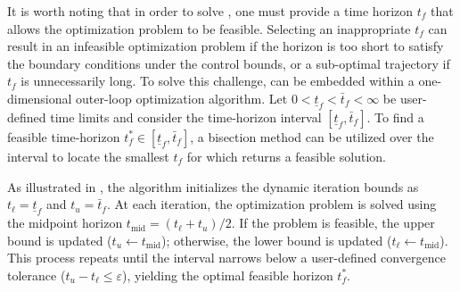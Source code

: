 \documentclass[conf]{new-aiaa}
\begin{document}
It is worth noting that in order to solve , one must provide a time horizon $t_f$ that allows the optimization problem to be feasible. Selecting an inappropriate $t_f$ can result in an infeasible optimization problem if the horizon is too short to satisfy the boundary conditions under the control bounds, or a sub-optimal trajectory if $t_f$ is unnecessarily long. To solve this challenge,  can be embedded within a one-dimensional outer-loop optimization algorithm. Let $0<\underline{t}_f < \bar{t}_f<\infty$ be user-defined time limits and consider the time-horizon interval $[\underline{t}_f, \bar{t}_f]$. To find a feasible time-horizon $t^*_f \in [\underline{t}_f, \bar{t}_f]$, a bisection method can be utilized over the interval to locate the smallest $t_f$ for which  returns a feasible solution. 

As illustrated in , the algorithm initializes the dynamic iteration bounds as $t_\ell = \underline{t}_f$ and $t_u = \bar{t}_f$. At each iteration, the optimization problem is solved using the midpoint horizon $t_{\mathrm{mid}} = (t_\ell + t_u)/2$. If the problem is feasible, the upper bound is updated ($t_u \leftarrow t_{\mathrm{mid}}$); otherwise, the lower bound is updated ($t_\ell \leftarrow t_{\mathrm{mid}}$). This process repeats until the interval narrows below a user-defined convergence tolerance ($t_u - t_\ell \leq \varepsilon$), yielding the optimal feasible horizon $t_f^*$.
\end{document}
